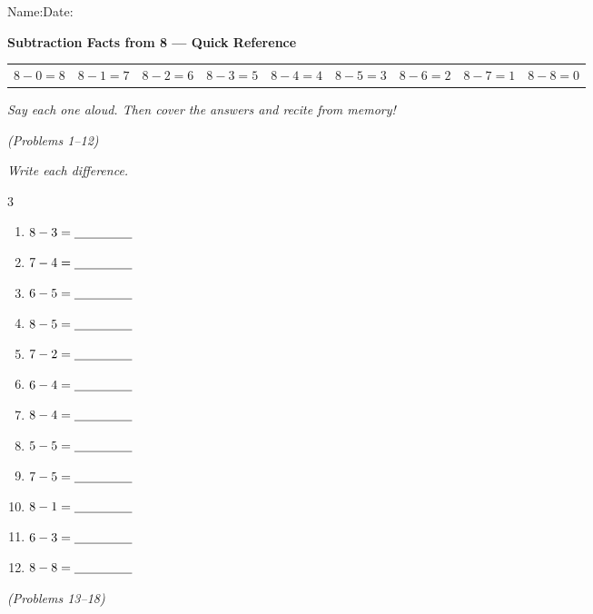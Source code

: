 \documentclass[12pt, letterpaper]{article}
\begin{document}

{\small Name:\ansblanklg \hfill Date:\ansblank}
\goldrule

\begin{instructbox}
\textbf{Subtraction Facts from 8 — Quick Reference}
\begin{center}
\begin{tabular}{*{9}{c}}
$8-0=8$ & $8-1=7$ & $8-2=6$ & $8-3=5$ & $8-4=4$ & $8-5=3$ & $8-6=2$ & $8-7=1$ & $8-8=0$
\end{tabular}
\end{center}
\textit{Say each one aloud. Then cover the answers and recite from memory!}
\end{instructbox}

\bigskip
{} \hfill \textit{(Problems 1–12)}

\medskip\noindent\textit{Write each difference.}

\bigskip
\begin{multicols}{3}
\begin{enumerate}[leftmargin=*,label=\textbf{\arabic*.},itemsep=10pt]
  \item $8-3=\underline{\hspace{1.6cm}}$
  \item $7-4=\underline{\hspace{1.6cm}}$
  \item $6-5=\underline{\hspace{1.6cm}}$
  \item $8-5=\underline{\hspace{1.6cm}}$
  \item $7-2=\underline{\hspace{1.6cm}}$
  \item $6-4=\underline{\hspace{1.6cm}}$
  \item $8-4=\underline{\hspace{1.6cm}}$
  \item $5-5=\underline{\hspace{1.6cm}}$
  \item $7-5=\underline{\hspace{1.6cm}}$
  \item $8-1=\underline{\hspace{1.6cm}}$
  \item $6-3=\underline{\hspace{1.6cm}}$
  \item $8-8=\underline{\hspace{1.6cm}}$
\end{enumerate}
\end{multicols}

\bigskip
{} \hfill \textit{(Problems 13–18)}
\end{document}
